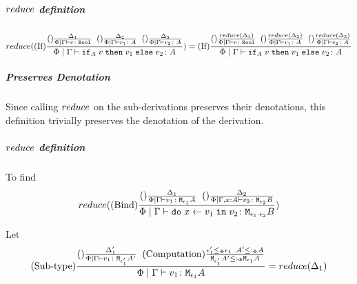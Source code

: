 \documentclass{report}
\begin{document}
            \subparagraph{$reduce$ definition}
                \begin{equation}
                    reduce((\text{If}) \frac{
                        (\text{}) \frac{\Delta_1}{\Phi\mid\Gamma \vdash v \colon \texttt{Bool}}
                        \;\;
                        (\text{}) \frac{\Delta_2}{\Phi\mid\Gamma \vdash v_1 \colon A}
                        \;\;
                        (\text{}) \frac{\Delta_3}{\Phi\mid\Gamma \vdash v_2 \colon A}
                    }{
                        \Phi\mid\Gamma \vdash \texttt{if}_{A}\; v\; \texttt{then}\; v_1 \;\texttt{else} \; v_2 \colon A
                    }) = (\text{If}) \frac{
                        (\text{}) \frac{reduce(\Delta_1)}{\Phi\mid\Gamma \vdash v \colon \texttt{Bool}}
                        \;\;
                        (\text{}) \frac{reduce(\Delta_2)}{\Phi\mid\Gamma \vdash v_1 \colon A}
                        \;\;
                        (\text{}) \frac{reduce(\Delta_3)}{\Phi\mid\Gamma \vdash v_2 \colon A}
                    }{
                        \Phi\mid\Gamma \vdash \texttt{if}_{A}\; v\; \texttt{then}\; v_1 \;\texttt{else} \; v_2 \colon A
                    }
                \end{equation}

            \subparagraph{Preserves Denotation}
                Since calling $reduce{}$ on the sub-derivations preserves their denotations, this definition trivially preserves the denotation of the derivation.


                \subparagraph{$reduce$ definition}

                To find
                \begin{equation}
                    reduce(
                        (\text{Bind}) \frac{
                            (\text{}) \frac{
                                \Delta_1
                            }{
                                \Phi\mid\Gamma \vdash v_1 \colon \texttt{M}_{\epsilon_1}{A}
                            }
                            \;\;
                            (\text{}) \frac{
                                \Delta_2
                            }{
                                \Phi\mid\Gamma, x: A \vdash v_2 \colon \texttt{M}_{\epsilon_2}{B}
                            }
                        }{
                            \Phi\mid\Gamma \vdash \texttt{do}\; x \leftarrow v_1 \;\texttt{in}\; v_2 \colon \texttt{M}_{\epsilon_1\cdot\epsilon_2}{B}
                        }
                    )
                \end{equation}


                Let \begin{equation}
                    (\text{Sub-type}) \frac{
                        (\text{}) \frac{\Delta'_1}{\Phi\mid\Gamma \vdash v_1 \colon \texttt{M}_{\epsilon'_1}{A'}}
                    \;\;
                    (\text{Computation}) \frac{ \epsilon_1'\leq_{\Phi} \epsilon_1\;\; A' \leq:_\Phi A }{\texttt{M}_{\epsilon_1'}{ A' }\leq:_\Phi\texttt{M}_{\epsilon_1}{A}}
                    }{
                        \Phi\mid\Gamma \vdash v_1 \colon \texttt{M}_{\epsilon_1}{A}
                    } = reduce(\Delta_1)
                \end{equation}
\end{document}
